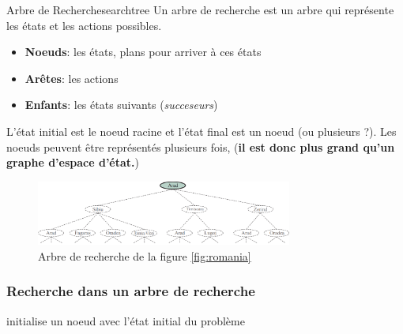 \begin{definition}{Arbre de Recherche}{searchtree}
    Un arbre de recherche est un arbre qui représente les états et les actions possibles.
    \begin{itemize}
        \item \textbf{Noeuds}: les états, plans pour arriver à ces états
        \item \textbf{Arêtes}: les actions
        \item \textbf{Enfants}: les états suivants (\textit{succeseurs})
    \end{itemize} 
    L'état initial est le noeud racine et l'état final est un noeud (ou plusieurs ?). 
    Les noeuds peuvent être représentés plusieurs fois, (\textbf{il est donc plus grand qu'un graphe d'espace d'état.})
\end{definition}

\begin{figure}[H]
    \begin{center}
        \includegraphics[width=0.75\textwidth]{./pictures/romst.png}
    \end{center}
    \caption{Arbre de recherche de la figure \ref{fig:romania}}\label{fig:romst}
\end{figure}

\subsubsection{Recherche dans un arbre de recherche} %
\label{sec:recherche_dans_un_arbre_de_recherche}

\begin{algorithm}[H]
    \caption{Algorithme de recherche}\label{alg:stsearch}
    \begin{algorithmic}
        \State initialise un noeud avec l'état initial du problème

        \EndLoop
        \EndFunction
    \end{algorithmic}
\end{algorithm}

